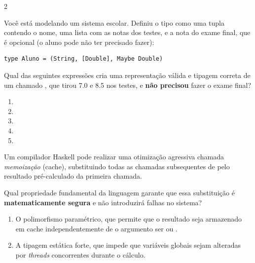 \documentclass[a4paper,10pt,brazil]{article}
\begin{document}
\begin{multicols}{2}
\begin{enumerate}
\end{enumerate}

Você está modelando um sistema escolar. Definiu o tipo  como uma tupla contendo o nome, uma lista com as notas dos testes, e a nota do exame final, que é opcional (o aluno pode não ter precisado fazer):
\begin{verbatim}
type Aluno = (String, [Double], Maybe Double)
\end{verbatim}

Qual das seguintes expressões cria uma representação válida e tipagem correta de um  chamado , que tirou 7.0 e 8.5 nos testes, e \textbf{não precisou} fazer o exame final?

\begin{enumerate}
  \item {}

  \item {}

  \item {}

  \item {}

  \item {}


\end{enumerate}

Um compilador Haskell pode realizar uma otimização agressiva chamada \emph{memoização} (cache), substituindo todas as chamadas subsequentes de  pelo resultado pré-calculado da primeira chamada. 

Qual propriedade fundamental da linguagem garante que essa substituição é \textbf{matematicamente segura} e não introduzirá falhas no sistema?

\begin{enumerate}
  \item O polimorfismo paramétrico, que permite que o resultado seja armazenado em cache independentemente de o argumento ser  ou .

  \item A tipagem estática forte, que impede que variáveis globais sejam alteradas por \textit{threads} concorrentes durante o cálculo.


\end{enumerate}
\end{multicols}
\end{document}
